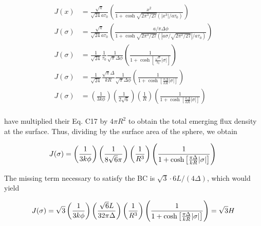 \documentclass[onecolumn]{aastex63}
\begin{document}
\begin{equation}
\begin{split}
    J(x) &= \frac{\sqrt{\pi}}{\sqrt{24}a\tau_0}\left(\frac{x^2}{1 + \cosh{\sqrt{2\pi^3/27}(|x^3|/a\tau_0)}}\right)\\
    J(\sigma) &= \frac{\sqrt{\pi}}{\sqrt{24}a\tau_0}\left(\frac{a/\pi \Delta \phi}{1 + \cosh{\sqrt{2\pi^3/27}(|a \sigma / \sqrt{2\pi^2/27}|/a\tau_0)}}\right)\\
    J(\sigma) &= \frac{1}{\sqrt{24}}\frac{1}{\tau_0}\frac{1}{\sqrt{\pi}\Delta \phi}\left(\frac{1}{1 + \cosh{\left[\frac{\sqrt{\pi}}{\tau_0}|\sigma|\right]}}\right)\\
    J(\sigma) &=
    \frac{1}{\sqrt{24}}\frac{\sqrt{\pi} \Delta}{kR}\frac{1}{\sqrt{\pi}\Delta \phi}\left(\frac{1}{1 + \cosh{\left[\frac{\pi \Delta}{kR}|\sigma|\right]}}\right)\\
    J(\sigma) &=
    \left(\frac{1}{3k\phi}\right) \left(\frac{1}{2\sqrt{6}}\right)\left(\frac{1}{R}\right)\left(\frac{1}{1 + \cosh{\left[\frac{\pi \Delta}{kR}|\sigma|\right]}}\right)\\
\end{split}
\end{equation}

\citet{2006ApJ...649...14D} have multiplied their Eq. C17 by $4\pi R^2$ to obtain the total emerging flux density at the surface. Thus, dividing by the surface area of the sphere, we obtain

\begin{equation}
    J(\sigma) =
    \left(\frac{1}{3k\phi}\right) \left(\frac{1}{8\sqrt{6}\pi}\right)\left(\frac{1}{R^3}\right)\left(\frac{1}{1 + \cosh{\left[\frac{\pi \Delta}{kR}|\sigma|\right]}}\right)\\
\end{equation}

The missing term necessary to satisfy the BC is $\sqrt{3} \cdot 6L/(4\Delta)$, which would yield

\begin{equation}
    J(\sigma) = \sqrt{3}
    \left(\frac{1}{3k\phi}\right) \left(\frac{\sqrt{6}L}{32\pi\Delta}\right)\left(\frac{1}{R^3}\right)\left(\frac{1}{1 + \cosh{\left[\frac{\pi \Delta}{kR}|\sigma|\right]}}\right) = \sqrt{3} H\\
\end{equation}




{}

\end{document}
